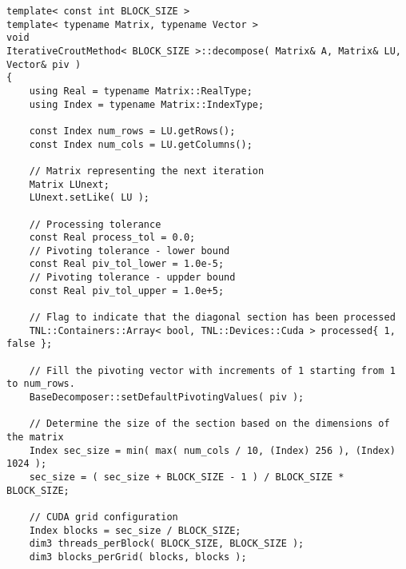 \begin{lstlisting}[caption={Excerpt from the implementation of ICM\_$x$PP.
The template parameter \code{BLOCK\_SIZE} is equivalent to $x$ in ICM\_$x$PP.
On input, matrix \code{A} is assumed to contain the values of $\mathbf{A}$, matrix \code{LU} is assumed to contain the initial estimate of the decomposition, and \code{piv} is expected to be appropriately sized and allocated on the Host.
On output, matrix \code{LU} contains the values of matrices $\mathbf{L}$ and $\mathbf{U}$ in the format presented in Equation~\ref{Equation:implementation->decomposition-project->implemented-solutions->decomposers->CMPP}, and \code{piv} contains the row permutations.
The \code{synchronizeStreams()} function is included below the \code{decompose()} method.
The \code{pivotBadElement()} function is shown in Listing~\ref{Listing:ICMxPP-implementation-pivot-bad-element}.
The code has been slightly modified for brevity, for example, the checks for appropriate sizing of matrices and vectors have been removed.},label={Listing:ICMxPP-implementation-excerpt}]
template< const int BLOCK_SIZE >
template< typename Matrix, typename Vector >
void
IterativeCroutMethod< BLOCK_SIZE >::decompose( Matrix& A, Matrix& LU, Vector& piv )
{
	using Real = typename Matrix::RealType;
	using Index = typename Matrix::IndexType;
	
	const Index num_rows = LU.getRows();
	const Index num_cols = LU.getColumns();
	
	// Matrix representing the next iteration
	Matrix LUnext;
	LUnext.setLike( LU );
	
	// Processing tolerance
	const Real process_tol = 0.0;
	// Pivoting tolerance - lower bound
	const Real piv_tol_lower = 1.0e-5;
	// Pivoting tolerance - uppder bound
	const Real piv_tol_upper = 1.0e+5;

	// Flag to indicate that the diagonal section has been processed
	TNL::Containers::Array< bool, TNL::Devices::Cuda > processed{ 1, false };
	
	// Fill the pivoting vector with increments of 1 starting from 1 to num_rows.
	BaseDecomposer::setDefaultPivotingValues( piv );
	
	// Determine the size of the section based on the dimensions of the matrix
	Index sec_size = min( max( num_cols / 10, (Index) 256 ), (Index) 1024 );
	sec_size = ( sec_size + BLOCK_SIZE - 1 ) / BLOCK_SIZE * BLOCK_SIZE;
	
	// CUDA grid configuration
	Index blocks = sec_size / BLOCK_SIZE;
	dim3 threads_perBlock( BLOCK_SIZE, BLOCK_SIZE );
	dim3 blocks_perGrid( blocks, blocks );
	

\end{lstlisting}
